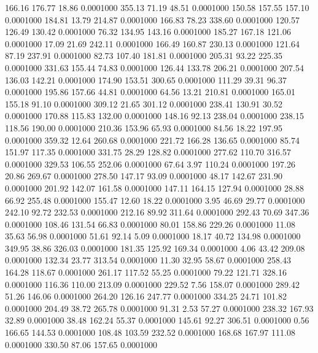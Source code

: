  166.16  176.77   18.86   0.0001000
 355.13   71.19   48.51   0.0001000
 150.58  157.55  157.10   0.0001000
 184.81   13.79  214.87   0.0001000
 166.83   78.23  338.60   0.0001000
 120.57  126.49  130.42   0.0001000
  76.32  134.95  143.16   0.0001000
 185.27  167.18  121.06   0.0001000
  17.09   21.69  242.11   0.0001000
 166.49  160.87  230.13   0.0001000
 121.64   87.19  237.91   0.0001000
  82.73  107.40  181.81   0.0001000
 205.31   93.22  225.35   0.0001000
 331.63  155.44   74.83   0.0001000
 126.44  133.78  206.21   0.0001000
 207.54  136.03  142.21   0.0001000
 174.90  153.51  300.65   0.0001000
 111.29   39.31   96.37   0.0001000
 195.86  157.66   44.81   0.0001000
  64.56   13.21  210.81   0.0001000
 165.01  155.18   91.10   0.0001000
 309.12   21.65  301.12   0.0001000
 238.41  130.91   30.52   0.0001000
 170.88  115.83  132.00   0.0001000
 148.16   92.13  238.04   0.0001000
 238.15  118.56  190.00   0.0001000
 210.36  153.96   65.93   0.0001000
  84.56   18.22  197.95   0.0001000
 359.32   12.64  260.68   0.0001000
 221.72  166.28  136.65   0.0001000
  85.74  151.97  117.35   0.0001000
 331.75   28.29  128.82   0.0001000
 277.62  110.70  316.57   0.0001000
 329.53  106.55  252.06   0.0001000
  67.64    3.97  110.24   0.0001000
 197.26   20.86  269.67   0.0001000
 278.50  147.17   93.09   0.0001000
  48.17  142.67  231.90   0.0001000
 201.92  142.07  161.58   0.0001000
 147.11  164.15  127.94   0.0001000
  28.88   66.92  255.48   0.0001000
 155.47   12.60   18.22   0.0001000
   3.95   46.69   29.77   0.0001000
 242.10   92.72  232.53   0.0001000
 212.16   89.92  311.64   0.0001000
 292.43   70.69  347.36   0.0001000
 108.46  131.54   66.83   0.0001000
  80.01  158.86  229.26   0.0001000
  11.08   35.63   56.98   0.0001000
  51.61   92.14    5.09   0.0001000
  18.17   40.72  134.98   0.0001000
 349.95   38.86  326.03   0.0001000
 181.35  125.92  169.34   0.0001000
   4.06   43.42  209.08   0.0001000
 132.34   23.77  313.54   0.0001000
  11.30   32.95   58.67   0.0001000
 258.43  164.28  118.67   0.0001000
 261.17  117.52   55.25   0.0001000
  79.22  121.71  328.16   0.0001000
 116.36  110.00  213.09   0.0001000
 229.52    7.56  158.07   0.0001000
 289.42   51.26  146.06   0.0001000
 264.20  126.16  247.77   0.0001000
 334.25   24.71  101.82   0.0001000
 204.49   38.72  265.78   0.0001000
  91.31    2.53   57.27   0.0001000
 238.32  167.93   32.89   0.0001000
  38.48  162.24   55.37   0.0001000
 145.61   92.27  306.51   0.0001000
   0.56  166.65  144.53   0.0001000
 108.48  103.59  232.52   0.0001000
 168.68  167.97  111.08   0.0001000
 330.50   87.06  157.65   0.0001000
